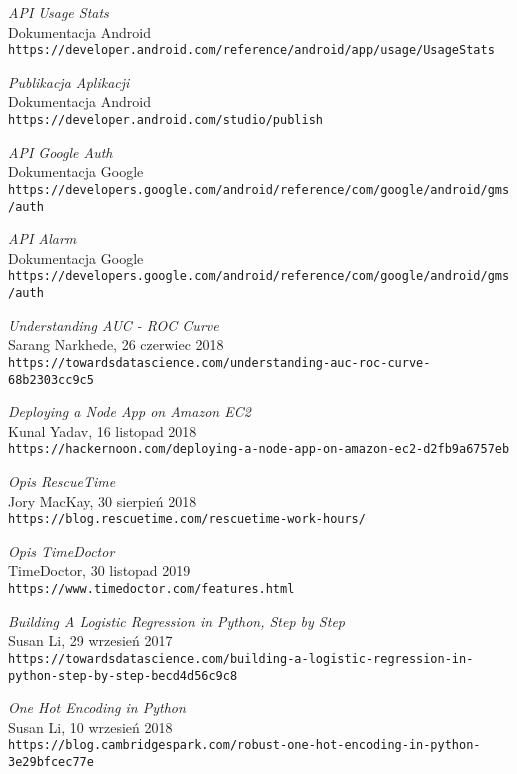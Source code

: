 \begin{thebibliography}{20}
\textit{API Usage Stats}
\\Dokumentacja Android
\\\texttt{https://developer.android.com/reference/android/app/usage/UsageStats}

\textit{Publikacja Aplikacji}
\\Dokumentacja Android
\\\texttt{https://developer.android.com/studio/publish}


\textit{API Google Auth}
\\Dokumentacja Google
\\\texttt{https://developers.google.com/android/reference/com/google/android/gms/auth}

\textit{API Alarm}
\\Dokumentacja Google
\\\texttt{https://developers.google.com/android/reference/com/google/android/gms/auth}

\textit{Understanding AUC - ROC Curve}
\\Sarang Narkhede, 26 czerwiec 2018
\\\texttt{https://towardsdatascience.com/understanding-auc-roc-curve-68b2303cc9c5}

\textit{Deploying a Node App on Amazon EC2}
\\Kunal Yadav, 16 listopad 2018
\\\texttt{https://hackernoon.com/deploying-a-node-app-on-amazon-ec2-d2fb9a6757eb}

\textit{Opis RescueTime}
\\Jory MacKay, 30 sierpień 2018
\\\texttt{https://blog.rescuetime.com/rescuetime-work-hours/}

\textit{Opis TimeDoctor}
\\TimeDoctor, 30 listopad 2019
\\\texttt{https://www.timedoctor.com/features.html}

\textit{Building A Logistic Regression in Python, Step by Step}
\\Susan Li, 29 wrzesień 2017
\\\texttt{https://towardsdatascience.com/building-a-logistic-regression-in-python-step-by-step-becd4d56c9c8}

\textit{One Hot Encoding in Python}
\\Susan Li, 10 wrzesień 2018
\\\texttt{https://blog.cambridgespark.com/robust-one-hot-encoding-in-python-3e29bfcec77e}


\end{thebibliography}
